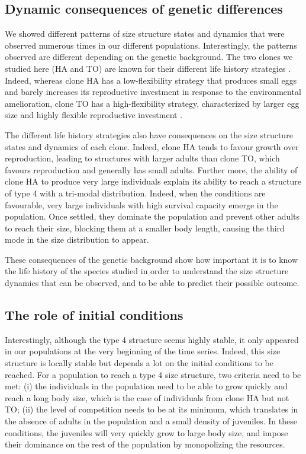 \subsection{Dynamic consequences of genetic differences}

We showed different patterns of size structure states and dynamics that were
observed numerous times in our different populations. Interestingly, the
patterns observed are different depending on the genetic background. The two
clones we studied here (HA and TO) are known for their different life history
strategies \autocites{tully2006a,tully2008a}. Indeed, whereas
clone HA has a low-flexibility strategy that produces small eggs and barely increases its
reproductive investment in response to the environmental amelioration, clone TO
has a high-flexibility strategy, characterized by larger egg size and highly
flexible reproductive investment \autocites{tully2008a}.

The different life history strategies also have consequences on the size
structure states and dynamics of each clone. Indeed, clone HA tends to favour
growth over reproduction, leading to structures with larger adults than clone
TO, which favours reproduction and generally has small adults. Further more, the
ability of clone HA to produce very large individuals explain its ability to
reach a structure of type 4 with a tri-modal distribution. Indeed, when the
conditions are favourable, very large individuals with high survival capacity
emerge in the population. Once settled, they dominate the population and prevent
other adults to reach their size, blocking them at a smaller body length,
causing the third mode in the size distribution to appear.

These consequences of the genetic background show how important it is to know
the life history of the species studied in order to understand the size
structure dynamics that can be observed, and to be able to predict their
possible outcome.

\subsection{The role of initial conditions}

Interestingly, although the type 4 structure seems highly stable, it only
appeared in our populations at the very beginning of the time series. Indeed,
this size structure is locally stable but depends a lot on the initial
conditions to be reached. For a population to reach a type 4 size structure, two
criteria need to be met: (i) the individuals in the population need to be able
to grow quickly and reach a long body size, which is the case of individuals
from clone HA but not TO; (ii) the level of competition needs to be at its
minimum, which translates in the absence of adults in the population and a small
density of juveniles. In these conditions, the juveniles will very quickly grow
to large body size, and impose their dominance on the rest of the population by
monopolizing the resources.

